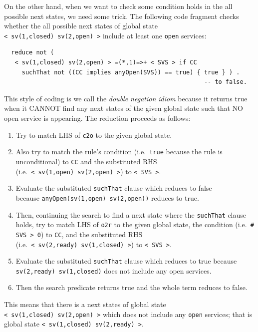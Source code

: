 \documentclass[12pt]{report}
\newcommand{\stt}[1]{{\small{\tt {#1}}}}
\begin{document}
On the other hand, when we want to check some condition holds in the all
possible next states, we need some trick. The following code fragment
checks whether the all possible next states of global state
\stt{<~sv(1,closed)~sv(2,open)~>} include at least one {\tt open} services:
\small
\begin{verbatim}
  reduce not (
   < sv(1,closed) sv(2,open) > =(*,1)=>+ < SVS > if CC
     suchThat not ((CC implies anyOpen(SVS)) == true) { true } ) .
                                                        -- to false.
\end{verbatim}
\normalsize
This style of coding is we call the {\it double negation idiom}
because it returns true when it CANNOT find any next states of the
given global state such that NO open service is appearing. The reduction
proceeds as follows:
\begin{enumerate}
\item Try to match LHS of {\tt c2o} to the given global state.
\item Also try to match the rule's condition (i.e.\ {\tt true} because
  the rule is unconditional) to {\tt CC} and the substituted RHS
  (i.e.\ \stt{<~sv(1,open)~sv(2,open)~>}) to \stt{<~SVS~>}.
\item Evaluate the substituted {\tt suchThat} clause which reduces to
  false \\ because \stt{anyOpen(sv(1,open) sv(2,open))} reduces to
  true.
\item Then, continuing the search to find a next state where the {\tt suchThat} clause holds,
  try to match LHS of {\tt o2r} to
  the given global state, the condition (i.e.\ \stt{\# SVS > 0}) to {\tt CC},
  and the substituted RHS (i.e.\ \stt{<~sv(2,ready)~sv(1,closed)~>}) to
  \stt{<~SVS~>}.
\item Evaluate the substituted {\tt suchThat} clause which reduces to
  true because \stt{sv(2,ready) sv(1,closed)} does not include any
  open services.
\item Then the search predicate returns true and the whole term
  reduces to false.
\end{enumerate}
This means that there is a next states of global state
\stt{<~sv(1,closed)~sv(2,open)~>} which does not include any {\tt open}
services; that is global state
\stt{<~sv(1,closed)~sv(2,ready)~>}.
\end{document}
